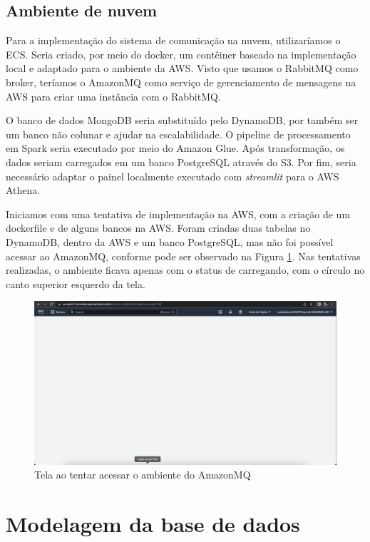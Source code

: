 \documentclass{article}
\begin{document}
\subsection*{Ambiente de nuvem}

Para a implementação do sistema de comunicação na nuvem, utilizaríamos o ECS. Seria criado, por meio do docker, um contêiner baseado na implementação local e adaptado para o ambiente da AWS. Visto que usamos o RabbitMQ como broker, teríamos o AmazonMQ como serviço de gerenciamento de mensagens na AWS para criar uma instância com o RabbitMQ.

O banco de dados MongoDB seria substituído pelo DynamoDB, por também ser um banco não colunar e ajudar na escalabilidade. O pipeline de processamento em Spark seria executado por meio do Amazon Glue. Após transformação, os dados seriam carregados em um banco PostgreSQL através do S3. Por fim, seria necessário adaptar o painel localmente executado com \textit{streamlit} para o AWS Athena.

Iniciamos com uma tentativa de implementação na AWS, com a criação de um dockerfile e de alguns bancos na AWS. Foram criadas duas tabelas no DynamoDB, dentro da AWS e um banco PostgreSQL, mas não foi possível acessar ao AmazonMQ, conforme pode ser observado na Figura \ref{amazonmq}. Nas tentativas realizadas, o ambiente ficava apenas com o status de carregando, com o círculo no canto superior esquerdo da tela.
\begin{figure}[H]
    \centering
    \includegraphics[scale = 0.25]{images/Erro Amazon MQ.jpeg}
    \caption{Tela ao tentar acessar o ambiente do AmazonMQ}
    \label{amazonmq}
\end{figure}

\section*{Modelagem da base de dados}
\end{document}
